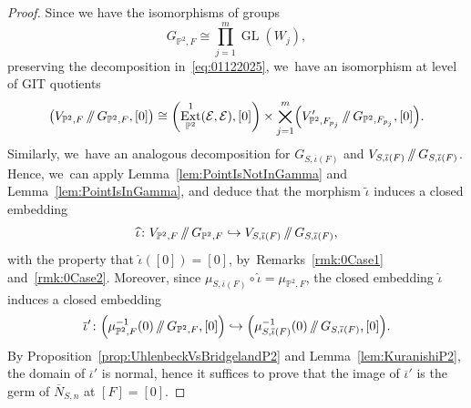 \documentclass[11pt]{article}
\newcommand\hto{\mathrel{\lhook\joinrel\to}}
\providecommand\sslash{\mathop{/\mkern-5.5mu/}}
\newcommand{\PP}{{\mathbb P}}\let\P\PP
\newcommand\cE{\mathcal{E}}
\DeclareMathOperator{\Ext}{Ext}
\DeclareMathOperator{\GL}{GL}
\let\wh\widehat
\theoremstyle{definition}
\begin{document}
\begin{proof}
Since we have the isomorphisms of groups
\[
G_{\PP^2,F}\cong\prod_{j=1}^m\GL(W_j),
\]
preserving the decomposition in~\eqref{eq:01122025}, we~have an isomorphism at level of GIT quotients
\[
\left(V_{\PP^2,F}\sslash G_{\P^2,F},[0]\right)\cong\left(\Ext^1_{\PP^2}(\cE,\cE),[0]\right)\times\bigtimes_{j=1}^m \Bigl(V_{\PP^2,F_{p_j}}'\sslash G_{\P^2,F_{p_j}},[0]\Bigr).
\]
Similarly, we~have an analogous decomposition for $G_{S,\overline{\iota}(F)}$ and $V_{S,\overline{\iota}(F)}\sslash G_{S,\overline{\iota}(F)}$.
Hence, we~can apply Lemma~\ref{lem:PointIsNotInGamma} and Lemma~\ref{lem:PointIsInGamma}, and deduce that the morphism $\widetilde{\iota}$ induces a closed embedding
\[
\widehat{\iota}\colon V_{\PP^2,F}\sslash G_{\P^2,F} \hto V_{S,\overline{\iota}(F)}\sslash G_{S,\overline{\iota}(F)},
\]
with the property that $\widehat{\iota}([0])=[0]$, by~Remarks~\ref{rmk:0Case1} and~\ref{rmk:0Case2}.
Moreover, since $\mu_{S,\overline{\iota}(F)}\circ\widehat{\iota}=\mu_{\PP^2,F}$, the closed embedding $\wh{\iota}$ induces a closed embedding
\[
\overline{\iota}'\colon \Bigl(\mu_{\PP^2,F}^{-1}(0)\sslash G_{\P^2,F},[0] \Bigr) \hto \Bigl(\mu_{S,\overline{\iota}(F)}^{-1}(0)\sslash G_{S,\overline{\iota}(F)},[0] \Bigr).
\]
By Proposition~\ref{prop:UhlenbeckVsBridgelandP2} and Lemma~\ref{lem:KuranishiP2}, the domain of $\overline{\iota}'$ is normal, hence it suffices to prove that the image of $\overline{\iota}'$ is the germ of $ \overline{N}_{S,n}$ at $[F]=[0]$.


\end{proof}
\end{document}
